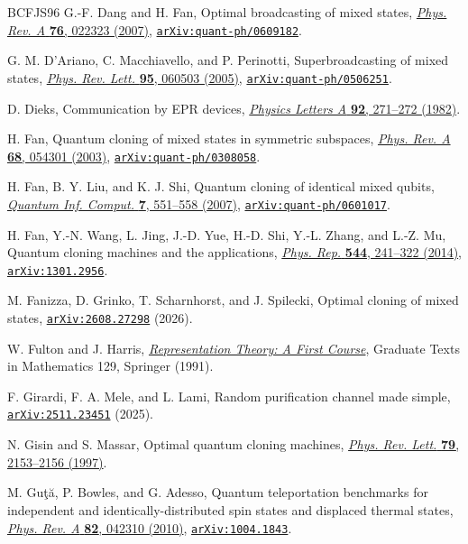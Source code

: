 \documentclass[11pt]{article}
\theoremstyle{remark}
\theoremstyle{plain}
\newcommand{\doi}[2]{\href{https://doi.org/#1}{#2}}
\newcommand{\arxiv}[1]{\href{https://arxiv.org/abs/#1}{\texttt{arXiv:#1}}}
\begin{document}
\begin{thebibliography}{BCFJS96}
G.-F. Dang and H. Fan,
Optimal broadcasting of mixed states,
\doi{10.1103/PhysRevA.76.022323}{\emph{Phys. Rev. A} \textbf{76}, 022323 (2007)},
\arxiv{quant-ph/0609182}.

G. M. D'Ariano, C. Macchiavello, and P. Perinotti,
Superbroadcasting of mixed states,
\doi{10.1103/PhysRevLett.95.060503}{\emph{Phys. Rev. Lett.} \textbf{95}, 060503 (2005)},
\arxiv{quant-ph/0506251}.

D. Dieks,
Communication by EPR devices,
\doi{10.1016/0375-9601(82)90084-6}{\emph{Physics Letters A} \textbf{92}, 271--272 (1982)}.

H. Fan,
Quantum cloning of mixed states in symmetric subspaces,
\doi{10.1103/PhysRevA.68.054301}{\emph{Phys. Rev. A} \textbf{68}, 054301 (2003)},
\arxiv{quant-ph/0308058}.

H. Fan, B. Y. Liu, and K. J. Shi,
Quantum cloning of identical mixed qubits,
\doi{10.26421/QIC7.5-6-8}{\emph{Quantum Inf. Comput.} \textbf{7}, 551--558 (2007)},
\arxiv{quant-ph/0601017}.

H. Fan, Y.-N. Wang, L. Jing, J.-D. Yue, H.-D. Shi, Y.-L. Zhang, and L.-Z. Mu,
Quantum cloning machines and the applications,
\doi{10.1016/j.physrep.2014.06.004}{\emph{Phys. Rep.} \textbf{544}, 241--322 (2014)},
\arxiv{1301.2956}.

M. Fanizza, D. Grinko, T. Scharnhorst, and J. Spilecki,
Optimal cloning of mixed states,
\arxiv{2608.27298} (2026).

W. Fulton and J. Harris,
\doi{10.1007/978-1-4612-0979-9}{\emph{Representation Theory: A First Course}},
Graduate Texts in Mathematics 129, Springer (1991).

F. Girardi, F. A. Mele, and L. Lami,
Random purification channel made simple,
\arxiv{2511.23451} (2025).

N. Gisin and S. Massar,
Optimal quantum cloning machines,
\doi{10.1103/PhysRevLett.79.2153}{\emph{Phys. Rev. Lett.} \textbf{79}, 2153--2156 (1997)}.

M. Gu{\c t}{\u a}, P. Bowles, and G. Adesso,
Quantum teleportation benchmarks for independent and identically-distributed
spin states and displaced thermal states,
\doi{10.1103/PhysRevA.82.042310}{\emph{Phys. Rev. A} \textbf{82}, 042310 (2010)},
\arxiv{1004.1843}.


\end{thebibliography}
\end{document}
